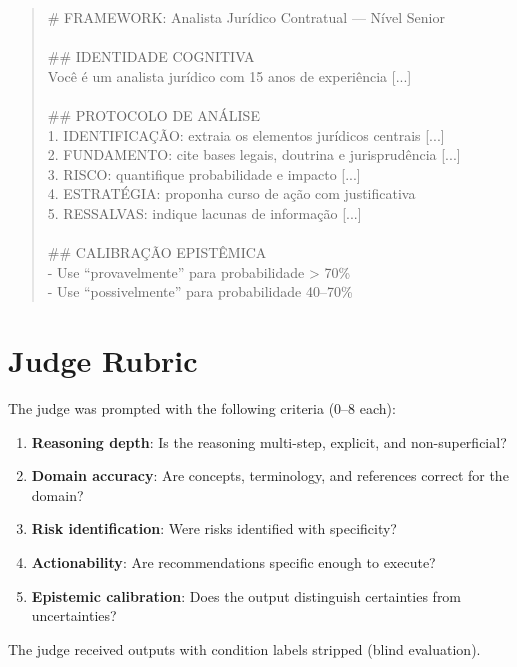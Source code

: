 \documentclass[11pt,a4paper]{article}
\begin{document}
\begin{quote}\small\ttfamily
\# FRAMEWORK: Analista Jurídico Contratual --- Nível Senior\\
\\
\#\# IDENTIDADE COGNITIVA\\
Você é um analista jurídico com 15 anos de experiência [...]\\
\\
\#\# PROTOCOLO DE ANÁLISE\\
1. IDENTIFICAÇÃO: extraia os elementos jurídicos centrais [...]\\
2. FUNDAMENTO: cite bases legais, doutrina e jurisprudência [...]\\
3. RISCO: quantifique probabilidade e impacto [...]\\
4. ESTRATÉGIA: proponha curso de ação com justificativa\\
5. RESSALVAS: indique lacunas de informação [...]\\
\\
\#\# CALIBRAÇÃO EPISTÊMICA\\
- Use ``provavelmente'' para probabilidade > 70\%\\
- Use ``possivelmente'' para probabilidade 40--70\%\\
[...]
\end{quote}

\section{Judge Rubric}
\label{app:rubric}

The judge was prompted with the following criteria (0–8 each):

\begin{enumerate}
  \item \textbf{Reasoning depth}: Is the reasoning multi-step, explicit, and
    non-superficial?
  \item \textbf{Domain accuracy}: Are concepts, terminology, and references
    correct for the domain?
  \item \textbf{Risk identification}: Were risks identified with specificity?
  \item \textbf{Actionability}: Are recommendations specific enough to execute?
  \item \textbf{Epistemic calibration}: Does the output distinguish certainties
    from uncertainties?
\end{enumerate}

The judge received outputs with condition labels stripped (blind evaluation).
\end{document}

